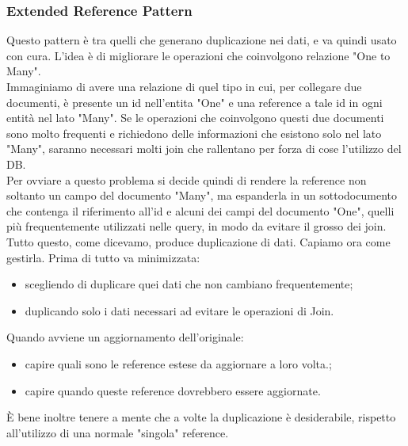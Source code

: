 \subsubsection{Extended Reference Pattern}
Questo pattern è tra quelli che generano duplicazione nei dati, e va quindi usato con cura.
L'idea è di migliorare le operazioni che coinvolgono relazione "One to Many".\\
Immaginiamo di avere una relazione di quel tipo in cui, per collegare due documenti, è presente un id nell'entita "One" e una reference a tale id in ogni entità nel lato "Many". Se le operazioni che coinvolgono questi due documenti sono molto frequenti e richiedono delle informazioni che esistono solo nel lato "Many", saranno necessari molti join che rallentano per forza di cose l'utilizzo del DB.\\
Per ovviare a questo problema si decide quindi di rendere la reference non soltanto un campo del documento "Many", ma espanderla in un sottodocumento che contenga il riferimento all'id e alcuni dei campi del documento "One", quelli più frequentemente utilizzati nelle query, in modo da evitare il grosso dei join.\\
Tutto questo, come dicevamo, produce duplicazione di dati. Capiamo ora come gestirla.
Prima di tutto va minimizzata:
\begin{itemize}
    \item scegliendo di duplicare quei dati che non cambiano frequentemente;
    \item duplicando solo i dati necessari ad evitare le operazioni di Join.
\end{itemize}
\noindent Quando avviene un aggiornamento dell'originale:
\begin{itemize}
    \item capire quali sono le reference estese da aggiornare a loro volta.;
    \item capire quando queste reference dovrebbero essere aggiornate.
\end{itemize}
\noindent È bene inoltre tenere a mente che a volte la duplicazione è desiderabile, rispetto all'utilizzo di una normale "singola" reference.

